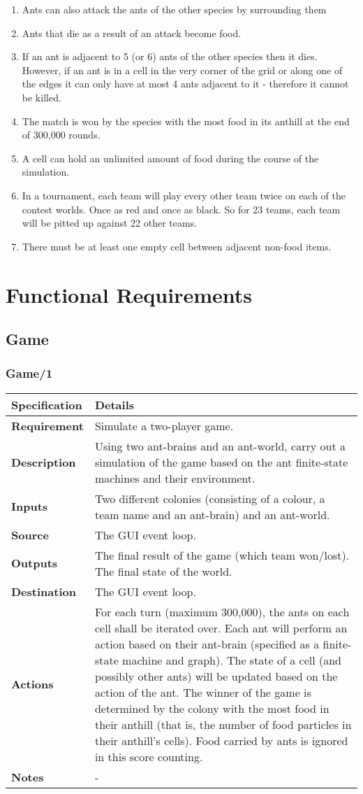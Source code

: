 \documentclass[11pt]{article}
\begin{document}
\begin{enumerate}
\item Ants can also attack the ants of the other species by surrounding them
\item Ants that die as a result of an attack become food.
\item If an ant is adjacent to 5 (or 6) ants of the other species then it dies. However, if an ant is in a cell in the very corner of the grid or along one of the edges it can only have at most 4 ants adjacent to it - therefore it cannot be killed.
\item The match is won by the species with the most food in its anthill at the end of 300,000 rounds.
\item A cell can hold an unlimited amount of food during the course of the simulation.
\item In a tournament, each team will play every other team twice on each of the contest worlds. Once as red and once as black. So for 23 teams, each team will be pitted up against 22 other teams.
\item There must be at least one empty cell between adjacent non-food items.
\end{enumerate}

\section{Functional Requirements}

\subsection{Game}\label{game}

\subsubsection*{Game/1}\label{game1}

\begin{longtable}[c]{@{\extracolsep{\fill}}|p{}|p{}|@{}}
\hline
\textbf{Specification} & \textbf{Details}\tabularnewline
\hline
\textbf{Requirement} & Simulate a two-player game.\tabularnewline
\textbf{Description} & Using two ant-brains and an ant-world, carry out
a simulation of the game based on the ant finite-state machines and
their environment.\tabularnewline
\textbf{Inputs} & Two different colonies (consisting of a colour, a team
name and an ant-brain) and an ant-world.\tabularnewline
\textbf{Source} & The GUI event loop.\tabularnewline
\textbf{Outputs} & The final result of the game (which team won/lost).
The final state of the world.\tabularnewline
\textbf{Destination} & The GUI event loop.\tabularnewline
\textbf{Actions} & For each turn (maximum 300,000), the ants on each
cell shall be iterated over. Each ant will perform an action based on
their ant-brain (specified as a finite-state machine and graph). The
state of a cell (and possibly other ants) will be updated based on the
action of the ant. The winner of the game is determined by the colony
with the most food in their anthill (that is, the number of food
particles in their anthill's cells). Food carried by ants is ignored in
this score counting.\tabularnewline
\textbf{Notes} & -\tabularnewline
\hline
\end{longtable}
\end{document}

